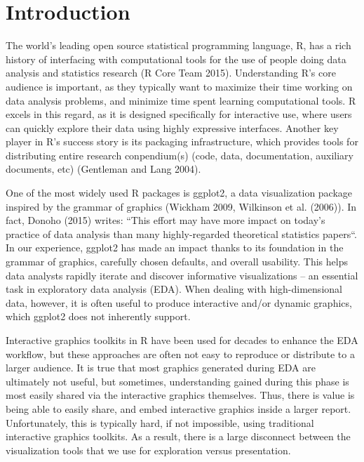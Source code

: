 \documentclass[12pt,]{article}
\theoremstyle{definition}
\theoremstyle{definition}
\theoremstyle{remark}
\begin{document}
\newpage
{} %


\section{Introduction}\label{intro}

The world's leading open source statistical programming language, R, has
a rich history of interfacing with computational tools for the use of
people doing data analysis and statistics research (R Core Team 2015).
Understanding R's core audience is important, as they typically want to
maximize their time working on data analysis problems, and minimize time
spent learning computational tools. R excels in this regard, as it is
designed specifically for interactive use, where users can quickly
explore their data using highly expressive interfaces. Another key
player in R's success story is its packaging infrastructure, which
provides tools for distributing entire research conpendium(s) (code,
data, documentation, auxiliary documents, etc) (Gentleman and Lang
2004).

One of the most widely used R packages is ggplot2, a data visualization
package inspired by the grammar of graphics (Wickham 2009, Wilkinson et
al. (2006)). In fact, Donoho (2015) writes: ``This effort may have more
impact on today's practice of data analysis than many highly-regarded
theoretical statistics papers``. In our experience, ggplot2 has made an
impact thanks to its foundation in the grammar of graphics, carefully
chosen defaults, and overall usability. This helps data analysts rapidly
iterate and discover informative visualizations -- an essential task in
exploratory data analysis (EDA). When dealing with high-dimensional
data, however, it is often useful to produce interactive and/or dynamic
graphics, which ggplot2 does not inherently support.

Interactive graphics toolkits in R have been used for decades to enhance
the EDA workflow, but these approaches are often not easy to reproduce
or distribute to a larger audience. It is true that most graphics
generated during EDA are ultimately not useful, but sometimes,
understanding gained during this phase is most easily shared via the
interactive graphics themselves. Thus, there is value is being able to
easily share, and embed interactive graphics inside a larger report.
Unfortunately, this is typically hard, if not impossible, using
traditional interactive graphics toolkits. As a result, there is a large
disconnect between the visualization tools that we use for exploration
versus presentation.
\end{document}
